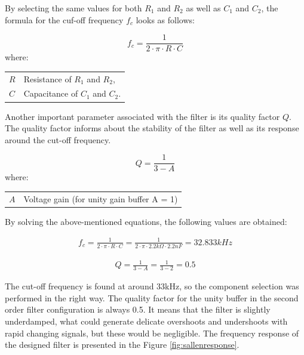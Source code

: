 \documentclass[12pt,a4paper]{article}
\makeatletter
\newenvironment{conditions}
  {\par\vspace{\abovedisplayskip}\noindent\begin{tabular}{>{$}l<{$} @{${}-{}$} l}}
  {\end{tabular}\par\vspace{\belowdisplayskip}}
\makeatother
\begin{document}
By selecting the same values for both $R_1$ and $R_2$ as well as $C_1$ and $C_2$, the formula for the cuf-off frequency $f_c$ looks as follows:

\begin{equation}
    f_{c} = \frac{1}{2\cdot \pi \cdot R\cdot C}
    \label{cutoff}
\end{equation}
where:
\begin{conditions}
	R     &  Resistance of $R_1$ and $R_2$, \\
	C 	  &  Capacitance of $C_1$ and $C_2$. \\
\end{conditions}

Another important parameter associated with the filter is its quality factor $Q$. The quality factor informs about the stability of the filter as well as its response around the cut-off frequency.

\begin{equation}
    Q = \frac{1}{3 - A}
    \label{factro}
\end{equation}
where:
\begin{conditions}
	A     &  Voltage gain (for unity gain buffer A = 1) \\
\end{conditions}

By solving the above-mentioned equations, the following values are obtained:

\begin{align}
\nonumber  f_c  =\frac{1}{2\cdot \pi \cdot R\cdot C}
 = \frac{1}{2\cdot \pi \cdot 2.2k \Omega\cdot 2.2nF}
 = 32.833kHz
\end{align}

\begin{align}
\nonumber  Q  =\frac{1}{3 - A}
  = \frac{1}{3 - 2}
  = 0.5
\end{align}

The cut-off frequency is found at around 33kHz, so the component selection was performed in the right way. The quality factor for the unity buffer in the second order filter configuration is always 0.5. It means that the filter is slightly underdamped, what could generate delicate overshoots and undershoots with rapid changing signals, but these would be negligible. The frequency response of the designed filter is presented in the Figure \ref{fig:sallenresponse}.  
\end{document}
